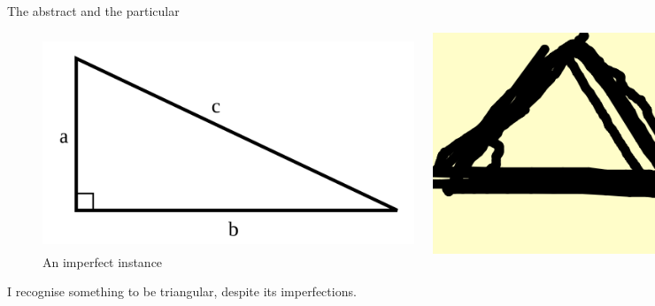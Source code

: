 \documentclass[xcolor=dvipsnames]{beamer}
\begin{document}
\begin{frame}{The abstract and the particular}
\begin{figure}
  \centering
  \begin{columns}
    \centering
    \caption {\emph{That which is triangular}}
    \includegraphics[width=0.99\textwidth]{triangular}
    \centering
    \caption {An imperfect instance}
    \includegraphics[width=0.99\textwidth]{triangle}
  \end{columns}
\end{figure}
I recognise something to be triangular, despite its imperfections.
\end{frame}
\end{document}
